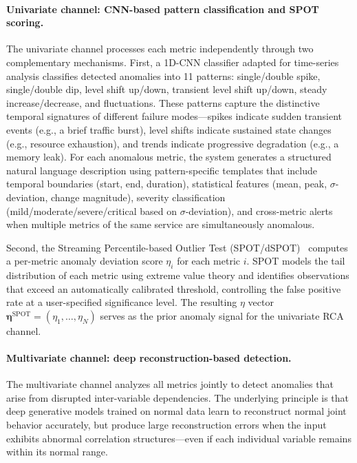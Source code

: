 \documentclass[a4paper,fleqn]{cas-dc}
\begin{document}
\paragraph{Univariate channel: CNN-based pattern classification and SPOT scoring.}
The univariate channel processes each metric independently through two complementary mechanisms.  First, a 1D-CNN classifier adapted for time-series analysis classifies detected anomalies into 11 patterns: single/double spike, single/double dip, level shift up/down, transient level shift up/down, steady increase/decrease, and fluctuations.  These patterns capture the distinctive temporal signatures of different failure modes---spikes indicate sudden transient events (e.g., a brief traffic burst), level shifts indicate sustained state changes (e.g., resource exhaustion), and trends indicate progressive degradation (e.g., a memory leak).  For each anomalous metric, the system generates a structured natural language description using pattern-specific templates that include temporal boundaries (start, end, duration), statistical features (mean, peak, $\sigma$-deviation, change magnitude), severity classification (mild/moderate/severe/critical based on $\sigma$-deviation), and cross-metric alerts when multiple metrics of the same service are simultaneously anomalous.

Second, the Streaming Percentile-based Outlier Test (SPOT/dSPOT)~\cite{10.1145/3097983.3098144} computes a per-metric anomaly deviation score $\eta_i$ for each metric $i$.  SPOT models the tail distribution of each metric using extreme value theory and identifies observations that exceed an automatically calibrated threshold, controlling the false positive rate at a user-specified significance level.  The resulting $\eta$ vector $\boldsymbol{\eta}^{\text{SPOT}} = (\eta_1, \ldots, \eta_N)$ serves as the prior anomaly signal for the univariate RCA channel.

\paragraph{Multivariate channel: deep reconstruction-based detection.}
The multivariate channel analyzes all metrics jointly to detect anomalies that arise from disrupted inter-variable dependencies.  The underlying principle is that deep generative models trained on normal data learn to reconstruct normal joint behavior accurately, but produce large reconstruction errors when the input exhibits abnormal correlation structures---even if each individual variable remains within its normal range.
\end{document}
